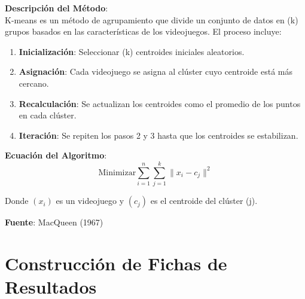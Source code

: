 \documentclass[
  letterpaper,
  DIV=11,
  numbers=noendperiod]{scrreprt}
\begin{document}
\textbf{Descripción del Método}:\\
K-means es un método de agrupamiento que divide un conjunto de datos en
(k) grupos basados en las características de los videojuegos. El proceso
incluye:

\begin{enumerate}
\def\labelenumi{\arabic{enumi}.}
\item
  \textbf{Inicialización}: Seleccionar (k) centroides iniciales
  aleatorios.
\item
  \textbf{Asignación}: Cada videojuego se asigna al clúster cuyo
  centroide está más cercano.
\item
  \textbf{Recalculación}: Se actualizan los centroides como el promedio
  de los puntos en cada clúster.
\item
  \textbf{Iteración}: Se repiten los pasos 2 y 3 hasta que los
  centroides se estabilizan.
\end{enumerate}

\textbf{Ecuación del Algoritmo}:\[
\text{Minimizar} \sum_{i=1}^{n} \sum_{j=1}^{k} \|x_i - c_j\|^2
\]

Donde \((x_i)\) es un videojuego y \((c_j)\) es el centroide del clúster
(j).

\textbf{Fuente}: MacQueen (1967)

\section*{Construcción de Fichas de
Resultados}\label{construcciuxf3n-de-fichas-de-resultados}
\end{document}
